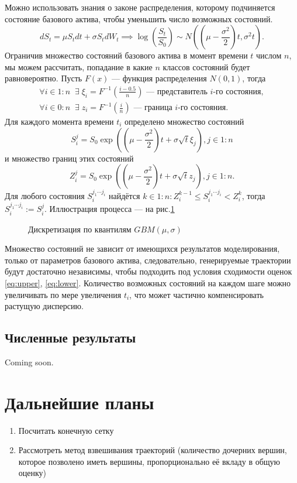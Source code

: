 \documentclass[specialist,
               substylefile = spbu.rtx,
               subf,href,colorlinks=true, 12pt]{disser}
\begin{document}
	        Можно использовать знания о законе распределения, которому подчиняется состояние базового актива, чтобы уменьшить число возможных состояний.
	        $$dS_t = \mu S_t dt + \sigma S_t dW_t \implies \log \left(\frac{S_t}{S_0}\right)\sim N\left(\left(\mu - \frac{\sigma^2}{2}\right)t, \sigma^2 t\right).$$
	        Ограничив множество состояний базового актива в момент времени $t$ числом $n$, мы можем рассчитать, попадание в какие $n$ классов состояний будет равновероятно. Пусть $F(x)$ --- функция распределения $N\left(0, 1\right)$, тогда
	        \begin{align}
	            \forall i \in 1:n \;\;\exists\; \xi_i = F^{-1}\left(\frac{i-0.5}{n}\right) \text{ --- представитель $i$-го состояния} ,\\
	            \forall i \in 0:n \;\;\exists\; z_i = F^{-1}\left(\frac{i}{n}\right) \text{ --- граница $i$-го состояния} .
	        \end{align}
	        Для каждого момента времени $t_i$ определено множество состояний $$S_i^j = S_0\exp\left(\left(\mu - \frac{\sigma^2}{2}\right)t + \sigma \sqrt{t}\xi_j\right), j\in 1:n$$ и множество границ этих состояний $$Z_i^j = S_0\exp\left(\left(\mu - \frac{\sigma^2}{2}\right)t + \sigma \sqrt{t}z_j\right), j\in 1:n.$$
	        Для любого состояния $S_i^{j_1\cdots j_i}$ найдётся $k\in 1:n : Z_i^{k-1} \leq S_i^{j_1\cdots j_i} < Z_i^k$, тогда $S_i^{j_1\cdots j_i} := S_i^j$. Иллюстрация процесса --- на рис.\ref{fig:grid}
	        \begin{figure}[h]
        	    \centering
        		\caption{Дискретизация по квантилям $GBM(\mu, \sigma)$}
        		\label{fig:grid}
        	\end{figure}
	        Множество состояний не зависит от имеющихся результатов моделирования, только от параметров базового актива, следовательно, генерируемые траектории будут достаточно независимы, чтобы подходить под условия сходимости оценок \eqref{eq:upper}, \eqref{eq:lower}. Количество возможных состояний на каждом шаге можно увеличивать по мере увеличения $t_i$, что может частично компенсировать растущую дисперсию.
	        \subsection{Численные результаты}
	            Coming soon.




\section*{Дальнейшие планы}
	\begin{enumerate}
		\item Посчитать конечную сетку
		\item Рассмотреть метод взвешивания траекторий (количество дочерних вершин, которое позволено иметь вершины, пропорционально её вкладу в общую оценку)
	\end{enumerate}
\nocite{*}


\end{document}
